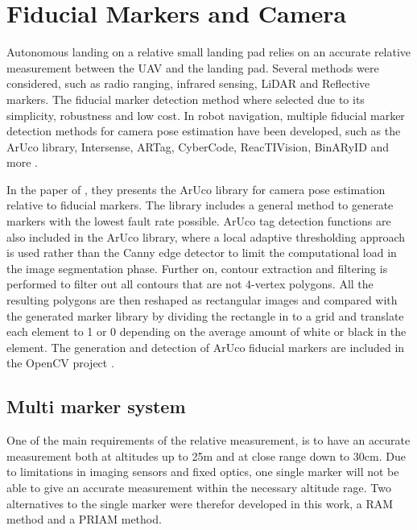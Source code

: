 \section{Fiducial Markers and Camera}\label{sec:fiducialMarkerAndCamera}
Autonomous landing on a relative small landing pad relies on an accurate relative measurement between the UAV and the landing pad. Several methods were considered, such as radio ranging, infrared sensing, LiDAR and Reflective markers. The fiducial marker detection method where selected due to its simplicity, robustness and low cost. In robot navigation, multiple fiducial marker detection methods for camera pose estimation have been developed, such as the ArUco library, Intersense, ARTag, CyberCode, ReacTIVision, BinARyID and more \citep{Aruco2014}. 

In the paper of \cite*{Aruco2014}, they presents the ArUco library for camera pose estimation relative to fiducial markers. The library includes a general method to generate markers with the lowest fault rate possible. ArUco tag detection functions are also included in the ArUco library, where a local adaptive thresholding approach is used rather than the Canny edge detector to limit the computational load in the image segmentation phase. Further on, contour extraction and filtering is performed to filter out all contours that are not 4-vertex polygons. All the resulting polygons are then reshaped as rectangular images and compared with the generated marker library by dividing the rectangle in to a grid and translate each element to 1 or 0 depending on the average amount of white or black in the element. The generation and detection of ArUco fiducial markers are included in the OpenCV project \cite{itseez2018opencv}.

\subsection{Multi marker system} %
\label{sub:multi_marker_system}
One of the main requirements of the relative measurement, is to have an accurate measurement both at altitudes up to 25m and at close range down to 30cm. Due to limitations in imaging sensors and fixed optics, one single marker will not be able to give an accurate measurement within the necessary altitude rage. Two alternatives to the single marker were therefor developed in this work, a \gls{RAM} method and a \gls{PRIAM} method.

